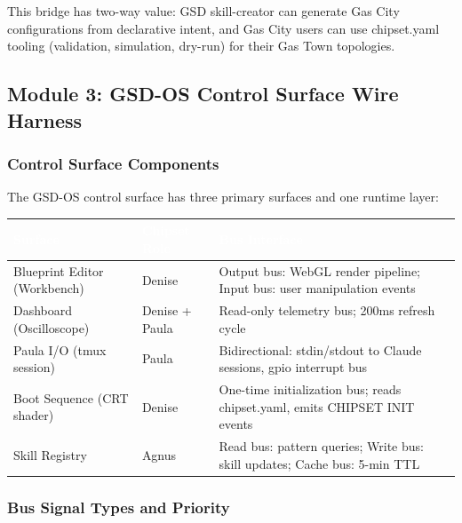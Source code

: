 \documentclass[11pt,letterpaper]{article}
\newcommand{\tableheader}[1]{\textbf{\sffamily\textcolor{white}{#1}}}
\begin{document}
This bridge has two-way value: GSD skill-creator can generate Gas City configurations from declarative intent, and Gas City users can use chipset.yaml tooling (validation, simulation, dry-run) for their Gas Town topologies.

\subsection{Module 3: GSD-OS Control Surface Wire Harness}

\subsubsection{Control Surface Components}

The GSD-OS control surface has three primary surfaces and one runtime layer:

\begin{center}
\begin{tabularx}{\textwidth}{L{3.5cm}L{3cm}X}
\toprule
{}
\tableheader{Surface} & \tableheader{Chipset Role} & \tableheader{Bus Interface} \\
\midrule
Blueprint Editor (Workbench) & Denise & Output bus: WebGL render pipeline; Input bus: user manipulation events \\
Dashboard (Oscilloscope) & Denise + Paula & Read-only telemetry bus; 200ms refresh cycle \\
Paula I/O (tmux session) & Paula & Bidirectional: stdin/stdout to Claude sessions, gpio interrupt bus \\
Boot Sequence (CRT shader) & Denise & One-time initialization bus; reads chipset.yaml, emits CHIPSET INIT events \\
Skill Registry & Agnus & Read bus: pattern queries; Write bus: skill updates; Cache bus: 5-min TTL \\
\bottomrule
\end{tabularx}
\end{center}

\subsubsection{Bus Signal Types and Priority}
\end{document}
